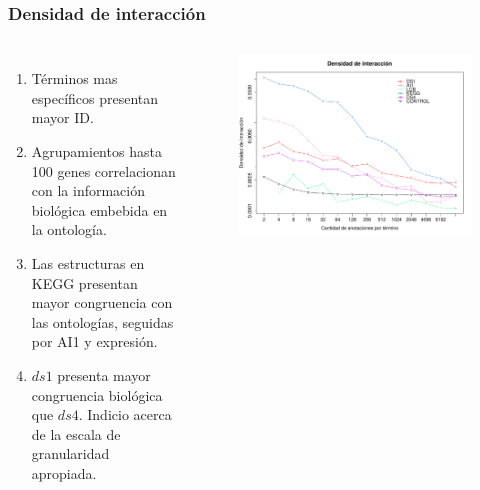 \documentclass[serif,9pt, t]{beamer}
\newcommand\Fontvi{\fontsize{7}{7.2}\selectfont}
\begin{document}
\begin{frame}\frametitle{Densidad de interacción} 
\begin{columns}[T]
	\Fontvi
	\begin{enumerate}
	\item Términos mas específicos presentan mayor ID.
	\item Agrupamientos hasta 100 genes correlacionan con la información biológica embebida en la ontología.
	\item Las estructuras en KEGG presentan mayor congruencia con las ontologías, seguidas por AI1 y expresión.
	\item $ds1$ presenta mayor congruencia biológica que $ds4$. Indicio acerca de la escala de granularidad apropiada.
	\end{enumerate}
	\begin{figure}
	    	\centering
		\includegraphics[width=1\textwidth]{interacting_densities_bpb.pdf}
	\end{figure}
\end{columns}
\end{frame}
\end{document}
